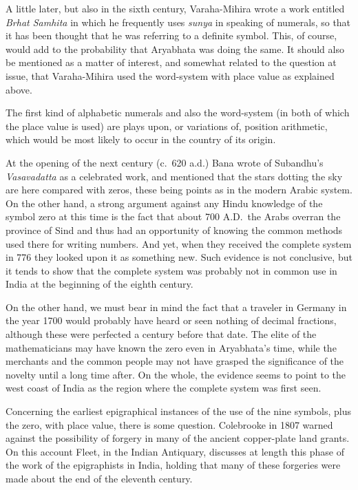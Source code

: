 \documentclass[11pt,a4paper]{article}
\begin{document}
A little later, but also in the sixth century, Varaha-Mihira wrote a work entitled \textit{Brhat Samhita} in which he frequently uses \textit{sunya} in speaking of numerals, so that it has been thought that he was referring to a definite symbol. This, of course, would add to the probability that Aryabhata was doing the same. It should also be mentioned as a matter of interest, and somewhat related to the question at issue, that Varaha-Mihira used the word-system with place value as explained above.

The first kind of alphabetic numerals and also the word-system (in both of which the place value is used) are plays upon, or variations of, position arithmetic, which would be most likely to occur in the country of its origin.

At the opening of the next century (c.~620 a.d.) Bana wrote of Subandhu's \textit{Vasavadatta} as a celebrated work, and mentioned that the stars dotting the sky are here compared with zeros, these being points as in the modern Arabic system. On the other hand, a strong argument against any Hindu knowledge of the symbol zero at this time is the fact that about 700 A.D.\ the Arabs overran the province of Sind and thus had an opportunity of knowing the common methods used there for writing numbers. And yet, when they received the complete system in 776 they looked upon it as something new. Such evidence is not conclusive, but it tends to show that the complete system was probably not in common use in India at the beginning of the eighth century.

On the other hand, we must bear in mind the fact that a traveler in Germany in the year 1700 would probably have heard or seen nothing of decimal fractions, although these were perfected a century before that date. The elite of the mathematicians may have known the zero even in Aryabhata's time, while the merchants and the common people may not have grasped the significance of the novelty until a long time after. On the whole, the evidence seems to point to the west coast of India as the region where the complete system was first seen.

Concerning the earliest epigraphical instances of the use of the nine symbols, plus the zero, with place value, there is some question. Colebrooke in 1807 warned against the possibility of forgery in many of the ancient copper-plate land grants. On this account Fleet, in the Indian Antiquary, discusses at length this phase of the work of the epigraphists in India, holding that many of these forgeries were made about the end of the eleventh century.
\end{document}
